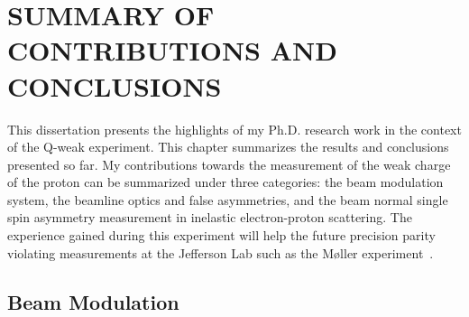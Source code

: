 \chapter{SUMMARY OF CONTRIBUTIONS AND CONCLUSIONS}
\label{DISCUSSION AND CONCLUSIONS}


This dissertation presents the highlights of my Ph.D. research work in the context of the Q-weak experiment. This chapter summarizes the results and conclusions presented so far.
%
%
%
My contributions towards the measurement of the weak charge of the proton can be summarized under three categories: the beam modulation system, the beamline optics and false asymmetries, and the beam normal single spin asymmetry measurement in inelastic electron-proton scattering.
The experience gained during this experiment will help the future precision parity violating measurements at the Jefferson Lab such as the M{\o}ller experiment~\cite{moller_2010}. 

\section{Beam Modulation}

